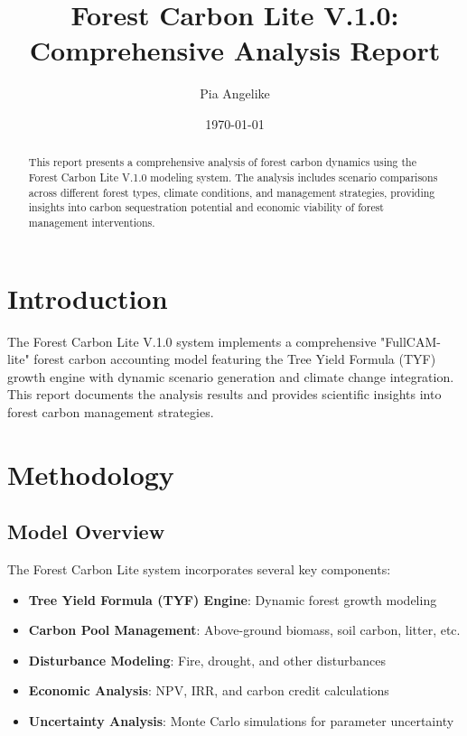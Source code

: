 \documentclass[11pt,a4paper]{article}
\title{Forest Carbon Lite V.1.0: Comprehensive Analysis Report}
\author{Pia Angelike}
\date{\today}
\begin{document}
\maketitle

\begin{abstract}
This report presents a comprehensive analysis of forest carbon dynamics using the Forest Carbon Lite V.1.0 modeling system. The analysis includes scenario comparisons across different forest types, climate conditions, and management strategies, providing insights into carbon sequestration potential and economic viability of forest management interventions.
\end{abstract}

\tableofcontents
\newpage

\section{Introduction}

The Forest Carbon Lite V.1.0 system implements a comprehensive "FullCAM-lite" forest carbon accounting model featuring the Tree Yield Formula (TYF) growth engine with dynamic scenario generation and climate change integration. This report documents the analysis results and provides scientific insights into forest carbon management strategies.

\section{Methodology}

\subsection{Model Overview}
The Forest Carbon Lite system incorporates several key components:

\begin{itemize}
    \item \textbf{Tree Yield Formula (TYF) Engine}: Dynamic forest growth modeling
    \item \textbf{Carbon Pool Management}: Above-ground biomass, soil carbon, litter, etc.
    \item \textbf{Disturbance Modeling}: Fire, drought, and other disturbances
    \item \textbf{Economic Analysis}: NPV, IRR, and carbon credit calculations
    \item \textbf{Uncertainty Analysis}: Monte Carlo simulations for parameter uncertainty
\end{itemize}
\end{document}
